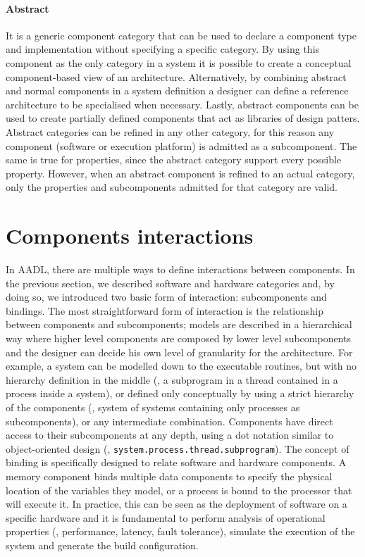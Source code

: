 \paragraph{Abstract} It is a generic component category that can be used to declare a component type and implementation without specifying a specific category. By using this component as the only category in a system it is possible to create a conceptual component-based view of an architecture. Alternatively, by combining abstract and normal components in a system definition a designer can define a reference architecture to be specialised when necessary. Lastly, abstract components can be used to create partially defined components that act as libraries of design patters. Abstract categories can be refined in any other category, for this reason any component (software or execution platform) is admitted as a subcomponent. The same is true for properties, since the abstract category support every possible property. However, when an abstract component is refined to an actual category, only the properties and subcomponents admitted for that category are valid.

\section{Components interactions}
In AADL, there are multiple ways to define interactions between components. In the previous section, we described software and hardware categories and, by doing so, we introduced  two basic form of interaction: subcomponents and bindings. The most straightforward form of interaction is the relationship between components and subcomponents; models are described in a hierarchical way where higher level components are composed by lower level subcomponents and the designer can decide his own level of granularity for the architecture. For example, a system can be modelled down to the executable routines, but with no hierarchy definition in the middle (\ie, a subprogram in a thread contained in a process inside a system), or defined only conceptually by using a strict hierarchy of the components (\ie, system of systems containing only processes as subcomponents), or any intermediate combination. Components have direct access to their subcomponents at any depth, using a dot notation similar to object-oriented design (\eg, \texttt{system.process.thread.subprogram}). The concept of binding is specifically designed to relate software and hardware components. A memory component binds multiple data components to specify the physical location of the variables they model, or a process is bound to the processor that will execute it. In practice, this can be seen as the deployment of software on a specific hardware and it is fundamental to perform analysis of operational properties (\eg, performance, latency, fault tolerance), simulate the execution of the system and generate the build configuration.

